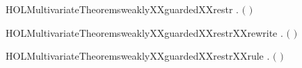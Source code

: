 \begin{SaveVerbatim}{HOLMultivariateTheoremsweaklyXXguardedXXrestr}
\HOLTokenTurnstile{} \HOLSymConst{\HOLTokenForall{}}  .   \ensuremath{(}  \ensuremath{)} \HOLSymConst{\HOLTokenImp{}}   
\end{SaveVerbatim}
\newcommand{\HOLMultivariateTheoremsweaklyXXguardedXXrestr}{\UseVerbatim{HOLMultivariateTheoremsweaklyXXguardedXXrestr}}
\begin{SaveVerbatim}{HOLMultivariateTheoremsweaklyXXguardedXXrestrXXrewrite}
\HOLTokenTurnstile{} \HOLSymConst{\HOLTokenForall{}}  .   \ensuremath{(}  \ensuremath{)} \HOLSymConst{\HOLTokenEquiv{}}   
\end{SaveVerbatim}
\newcommand{\HOLMultivariateTheoremsweaklyXXguardedXXrestrXXrewrite}{\UseVerbatim{HOLMultivariateTheoremsweaklyXXguardedXXrestrXXrewrite}}
\begin{SaveVerbatim}{HOLMultivariateTheoremsweaklyXXguardedXXrestrXXrule}
\HOLTokenTurnstile{} \HOLSymConst{\HOLTokenForall{}}  .    \HOLSymConst{\HOLTokenImp{}}   \ensuremath{(}  \ensuremath{)}
\end{SaveVerbatim}
\newcommand{\HOLMultivariateTheoremsweaklyXXguardedXXrestrXXrule}{\UseVerbatim{HOLMultivariateTheoremsweaklyXXguardedXXrestrXXrule}}
